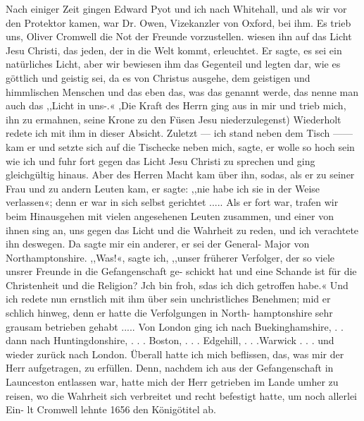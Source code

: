 Nach einiger Zeit gingen Edward Pyot 
und ich nach Whitehall, und als wir vor 
den Protektor kamen, war Dr. Owen, 
Vizekanzler von Oxford, bei ihm. Es trieb uns, 
Oliver Cromwell die
Not der Freunde vorzustellen.   wiesen ihn auf das Licht
Jesu Christi, das jeden, der in die Welt kommt, erleuchtet.
Er sagte, es sei ein natürliches Licht, aber wir bewiesen ihm das
Gegenteil und legten dar, wie es göttlich und geistig sei, da es
von Christus ausgehe, dem geistigen und himmlischen Menschen
und das eben das, was das  genannt werde,
das nenne man auch das ,,Licht in uns-.« ,Die Kraft des Herrn
ging aus in mir und trieb mich, ihn zu ermahnen, seine Krone
zu den Füsen Jesu niederzulegenst) Wiederholt redete ich mit
ihm in dieser Absicht. Zuletzt — ich stand neben dem Tisch ——
kam er und setzte sich auf die Tischecke neben mich, sagte, er wolle
so hoch sein wie ich und fuhr fort gegen das Licht Jesu Christi
zu sprechen und ging gleichgültig hinaus. Aber des Herren Macht
kam über ihn, sodas, als er zu seiner Frau und zu andern
Leuten kam, er sagte: ,,nie habe ich sie in der Weise verlassen«;
denn er war in sich selbst gerichtet .....
Als er fort war, trafen wir beim Hinausgehen mit vielen
angesehenen Leuten zusammen, und einer von ihnen sing an, uns
gegen das Licht und die Wahrheit zu reden, und ich verachtete
ihn deswegen. Da sagte mir ein anderer, er sei der General-
Major von Northamptonshire. ,,Was!«, sagte ich, ,,unser früherer
Verfolger, der so viele unsrer Freunde in die Gefangenschaft ge-
schickt hat und eine Schande ist für die Christenheit und die
Religion? Jch bin froh, sdas ich dich getroffen habe.« Und ich
redete nun ernstlich mit ihm über sein unchristliches Benehmen;
mid er schlich hinweg, denn er hatte die Verfolgungen in North-
hamptonshire sehr grausam betrieben gehabt .....
Von London ging ich nach Buekinghamshire, . . dann nach
Huntingdonshire, . . . Boston, . . . Edgehill, . . .Warwick . . .
und wieder zurück nach London. Überall hatte ich mich beflissen,
das, was mir der Herr aufgetragen, zu erfüllen. Denn, nachdem
ich aus der Gefangenschaft in Launceston entlassen war, hatte mich
der Herr getrieben im Lande umher zu reisen, wo die Wahrheit
sich verbreitet und recht befestigt hatte, um noch allerlei Ein-
lt Cromwell lehnte 1656 den Königötitel ab.


